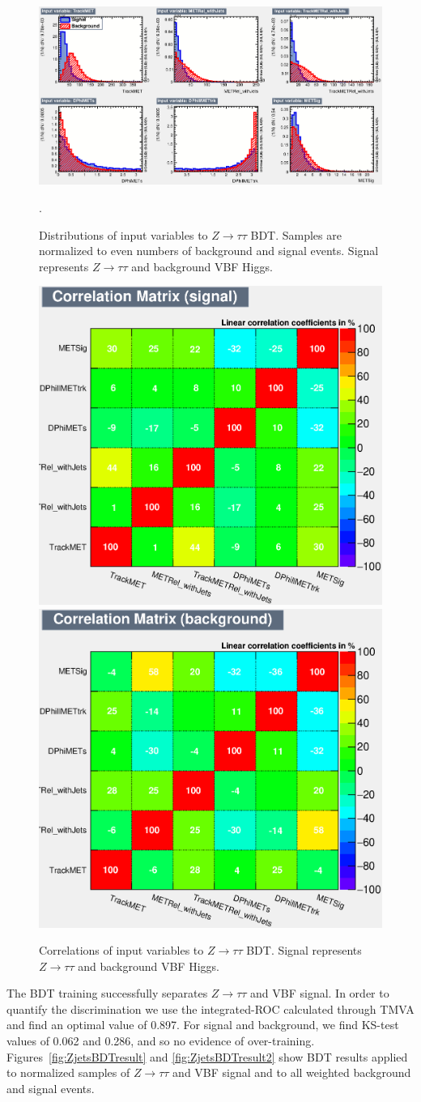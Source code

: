 \begin{figure}[!htbp]
    \centering
    \includegraphics[width=0.85\linewidth]{Pictures/variables_id_c1.eps}
    \caption{Distributions of input variables to $Z\rightarrow\tau\tau$ BDT. Samples are normalized to even numbers of background and signal events. Signal represents $Z\rightarrow\tau\tau$ and background VBF Higgs.}.
    \label{fig:ZjetsBDTinput}
\end{figure}
\begin{figure}[!htbp]
\centering
  \includegraphics[width=.4\linewidth]{Pictures/CorrelationMatrixS.eps}
  \includegraphics[width=.4\linewidth]{Pictures/CorrelationMatrixB.eps}
\caption{Correlations of input variables to $Z\rightarrow\tau\tau$ BDT. Signal represents $Z\rightarrow\tau\tau$ and background VBF Higgs.}
\label{fig:ZjetscorrSB}
\end{figure}
The BDT training successfully separates $Z\rightarrow\tau\tau$ and VBF signal. In order to quantify the discrimination we use the integrated-ROC calculated through TMVA and find an optimal value of 0.897. For signal and background, we find KS-test values of 0.062 and 0.286, and so no evidence of over-training. Figures~\ref{fig:ZjetsBDTresult} and \ref{fig:ZjetsBDTresult2} show BDT results applied to normalized samples of $Z\rightarrow\tau\tau$ and VBF signal and to all weighted background and signal events. 


